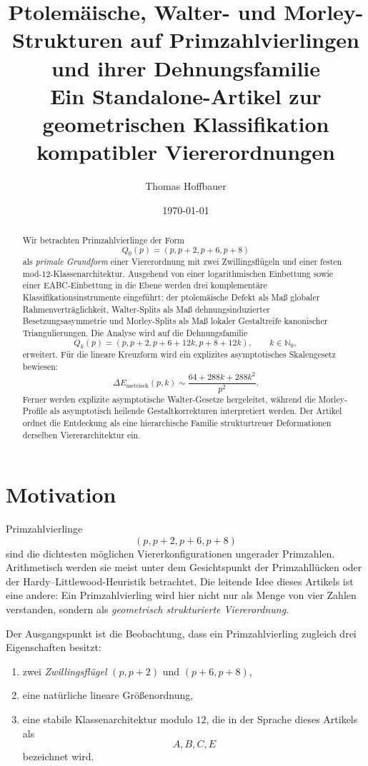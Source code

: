 \documentclass[11pt,a4paper]{article}
\title{\textbf{Ptolemäische, Walter- und Morley-Strukturen auf Primzahlvierlingen\\ und ihrer Dehnungsfamilie}\\[0.4em]
\large Ein Standalone-Artikel zur geometrischen Klassifikation kompatibler Viererordnungen}
\author{Thomas Hoffbauer}
\date{\today}
\theoremstyle{definition}
\theoremstyle{remark}
\newcommand{\N}{\mathbb{N}}
\begin{document}
\maketitle

\begin{abstract}
Wir betrachten Primzahlvierlinge der Form
\[
Q_0(p)=(p,p+2,p+6,p+8)
\]
als \emph{primale Grundform} einer Viererordnung mit zwei Zwillingsflügeln und einer festen mod-$12$-Klassenarchitektur. Ausgehend von einer logarithmischen Einbettung sowie einer EABC-Einbettung in die Ebene werden drei komplementäre Klassifikationsinstrumente eingeführt: der ptolemäische Defekt als Maß globaler Rahmenverträglichkeit, Walter-Splits als Maß dehnungsinduzierter Besetzungsasymmetrie und Morley-Splits als Maß lokaler Gestaltreife kanonischer Triangulierungen. Die Analyse wird auf die Dehnungsfamilie
\[
Q_k(p)=(p,p+2,p+6+12k,p+8+12k), \qquad k\in\N_0,
\]
erweitert. Für die lineare Kreuzform wird ein explizites asymptotisches Skalengesetz bewiesen:
\[
\Delta E_{\mathrm{metrisch}}(p,k)\sim \frac{64+288k+288k^2}{p^2}.
\]
Ferner werden explizite asymptotische Walter-Gesetze hergeleitet, während die Morley-Profile als asymptotisch heilende Gestaltkorrekturen interpretiert werden. Der Artikel ordnet die Entdeckung als eine hierarchische Familie strukturtreuer Deformationen derselben Viererarchitektur ein.
\end{abstract}

\section{Motivation}

Primzahlvierlinge
\[
(p,p+2,p+6,p+8)
\]
sind die dichtesten möglichen Viererkonfigurationen ungerader Primzahlen. Arithmetisch werden sie meist unter dem Gesichtspunkt der Primzahllücken oder der Hardy--Littlewood-Heuristik betrachtet. Die leitende Idee dieses Artikels ist eine andere: Ein Primzahlvierling wird hier nicht nur als Menge von vier Zahlen verstanden, sondern als \emph{geometrisch strukturierte Viererordnung}.

Der Ausgangspunkt ist die Beobachtung, dass ein Primzahlvierling zugleich drei Eigenschaften besitzt:
\begin{enumerate}[label=(\arabic*)]
\item zwei \emph{Zwillingsflügel} $(p,p+2)$ und $(p+6,p+8)$,
\item eine natürliche lineare Größenordnung,
\item eine stabile Klassenarchitektur modulo $12$, die in der Sprache dieses Artikels als
\[
A,B,C,E
\]
bezeichnet wird.
\end{enumerate}
\end{document}

